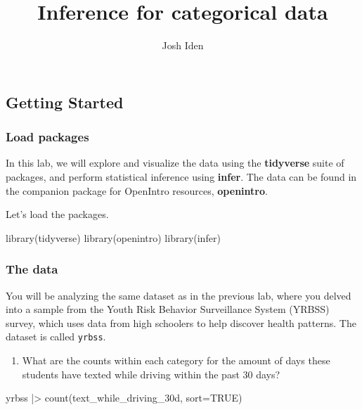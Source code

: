 \documentclass[
]{article}
\title{Inference for categorical data}
\author{Josh Iden}
\date{}
\newenvironment{Shaded}{\begin{snugshade}}{\end{snugshade}}
\newcommand{\AttributeTok}[1]{\textcolor[rgb]{0.77,0.63,0.00}{#1}}
\newcommand{\ConstantTok}[1]{\textcolor[rgb]{0.00,0.00,0.00}{#1}}
\newcommand{\FunctionTok}[1]{\textcolor[rgb]{0.00,0.00,0.00}{#1}}
\newcommand{\NormalTok}[1]{#1}
\newcommand{\SpecialCharTok}[1]{\textcolor[rgb]{0.00,0.00,0.00}{#1}}
\providecommand{\tightlist}{%
  \setlength{\itemsep}{0pt}\setlength{\parskip}{0pt}}
\begin{document}
\maketitle

\hypertarget{getting-started}{%
\subsection{Getting Started}\label{getting-started}}

\hypertarget{load-packages}{%
\subsubsection{Load packages}\label{load-packages}}

In this lab, we will explore and visualize the data using the
\textbf{tidyverse} suite of packages, and perform statistical inference
using \textbf{infer}. The data can be found in the companion package for
OpenIntro resources, \textbf{openintro}.

Let's load the packages.

\begin{Shaded}
\begin{Highlighting}[]
\FunctionTok{library}\NormalTok{(tidyverse)}
\FunctionTok{library}\NormalTok{(openintro)}
\FunctionTok{library}\NormalTok{(infer)}
\end{Highlighting}
\end{Shaded}

\hypertarget{the-data}{%
\subsubsection{The data}\label{the-data}}

You will be analyzing the same dataset as in the previous lab, where you
delved into a sample from the Youth Risk Behavior Surveillance System
(YRBSS) survey, which uses data from high schoolers to help discover
health patterns. The dataset is called \texttt{yrbss}.

\begin{enumerate}
\def\labelenumi{\arabic{enumi}.}
\tightlist
\item
  What are the counts within each category for the amount of days these
  students have texted while driving within the past 30 days?
\end{enumerate}

\begin{Shaded}
\begin{Highlighting}[]
\NormalTok{yrbss }\SpecialCharTok{|\textgreater{}} 
  \FunctionTok{count}\NormalTok{(text\_while\_driving\_30d, }\AttributeTok{sort=}\ConstantTok{TRUE}\NormalTok{)}
\end{Highlighting}
\end{Shaded}
\end{document}
